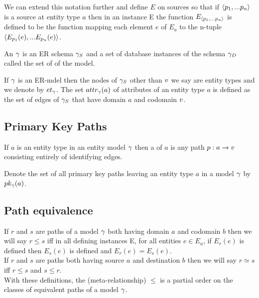 We can extend this notation further and define $E$ on sources so that if 
$\langle p_1,...p_n\rangle$ is a source at entity type $a$ then in an instance E
the function  $E_{\langle p_1,...p_n\rangle}$ is defined to be the function mapping each element $e$ 
of $E_a$ to the n-tuple
$\langle E_{p_1}(e),...E_{p_n}(e)\rangle$.

\begin{definition}
\noindent An  $\gamma$ is an ER schema $\gamma_S$ and a set of database instances of the schema $\gamma_D$ called the set of
 of the model. \\
\end{definition}

If $\gamma$ is an ER-mdel then the nodes of $\gamma_S$ other than $v$ we say are entity types and we denote by $et_{\gamma}$. The set $attr_{\gamma}(a)$ of attributes of an entity type $a$ is defined as the set of edges of $\gamma_S$ that have 
domain $a$  and  codomain $v$.

\subsection{Primary Key Paths}
\label{primarykeypath}
\begin{definition}
If $a$ is an entity type in an entity model $\gamma$ then a 
of $a$ is any path $p:a \rightarrow v$ consisting entirely of identifying edges. 
\end{definition}

Denote the set of all primary key paths leaving an entity type $a$ in a model $\gamma$ by 
$pk_{\gamma}(a)$.

\subsection{Path equivalence}
\label{equivalencedefinition}

\noindent If $r$ and $s$ are paths of a model $\gamma$ both having domain $a$ and codomain $b$ then we will say $r \leq s$ iff in all defining instances E, for all entities $e \in E_a$, if $E_r(e)$ is defined then $E_s(e)$ is defined and $E_r(e)=E_s(e)$. \\

\noindent If $r$ and $s$ are paths both having source $a$ and destination $b$ then we will say $r \simeq s$ iff $r \leq s$ and $s \leq r$. \\

\noindent With these definitions,  the (meta-relationship) $\leq$ is a partial order on the classes of equivalent paths of a model $\gamma$. \\

